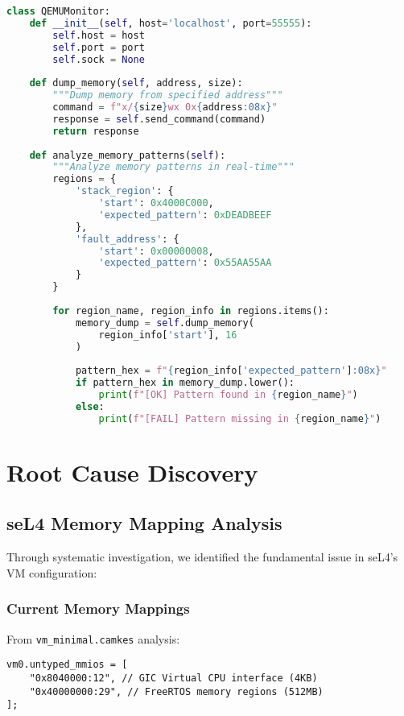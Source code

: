 \documentclass[11pt,a4paper]{article}
\begin{document}
\begin{lstlisting}[language=Python,caption={QEMU Memory Monitor Integration}]
class QEMUMonitor:
    def __init__(self, host='localhost', port=55555):
        self.host = host
        self.port = port
        self.sock = None
    
    def dump_memory(self, address, size):
        """Dump memory from specified address"""
        command = f"x/{size}wx 0x{address:08x}"
        response = self.send_command(command)
        return response
    
    def analyze_memory_patterns(self):
        """Analyze memory patterns in real-time"""
        regions = {
            'stack_region': {
                'start': 0x4000C000,
                'expected_pattern': 0xDEADBEEF
            },
            'fault_address': {
                'start': 0x00000008,
                'expected_pattern': 0x55AA55AA
            }
        }
        
        for region_name, region_info in regions.items():
            memory_dump = self.dump_memory(
                region_info['start'], 16
            )
            
            pattern_hex = f"{region_info['expected_pattern']:08x}"
            if pattern_hex in memory_dump.lower():
                print(f"[OK] Pattern found in {region_name}")
            else:
                print(f"[FAIL] Pattern missing in {region_name}")
\end{lstlisting}

\section{Root Cause Discovery}

\subsection{seL4 Memory Mapping Analysis}

Through systematic investigation, we identified the fundamental issue in seL4's VM configuration:

\subsubsection{Current Memory Mappings}

From \texttt{vm\_minimal.camkes} analysis:

\begin{lstlisting}[caption={Current seL4 VM Memory Configuration}]
vm0.untyped_mmios = [
    "0x8040000:12", // GIC Virtual CPU interface (4KB)
    "0x40000000:29", // FreeRTOS memory regions (512MB)
];
\end{lstlisting}
\end{document}
